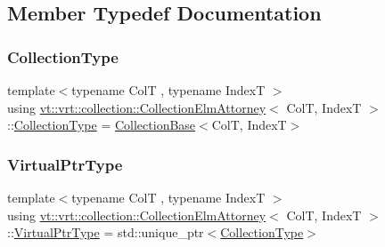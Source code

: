 \subsection{Member Typedef Documentation}
\mbox{\label{structvt_1_1vrt_1_1collection_1_1_collection_elm_attorney_a72d0076f73ac093f85ba5910337c6d02}} 
\subsubsection{\texorpdfstring{Collection\+Type}{CollectionType}}
{\footnotesize\ttfamily template$<$typename ColT , typename IndexT $>$ \\
using \hyperlink{structvt_1_1vrt_1_1collection_1_1_collection_elm_attorney}{vt\+::vrt\+::collection\+::\+Collection\+Elm\+Attorney}$<$ ColT, IndexT $>$\+::\hyperlink{structvt_1_1vrt_1_1collection_1_1_collection_elm_attorney_a72d0076f73ac093f85ba5910337c6d02}{Collection\+Type} =  \hyperlink{structvt_1_1vrt_1_1collection_1_1_collection_base}{Collection\+Base}$<$ColT, IndexT$>$}

\mbox{\label{structvt_1_1vrt_1_1collection_1_1_collection_elm_attorney_a36fe2c7f590baec1038c592db59a6315}} 
\subsubsection{\texorpdfstring{Virtual\+Ptr\+Type}{VirtualPtrType}}
{\footnotesize\ttfamily template$<$typename ColT , typename IndexT $>$ \\
using \hyperlink{structvt_1_1vrt_1_1collection_1_1_collection_elm_attorney}{vt\+::vrt\+::collection\+::\+Collection\+Elm\+Attorney}$<$ ColT, IndexT $>$\+::\hyperlink{structvt_1_1vrt_1_1collection_1_1_collection_elm_attorney_a36fe2c7f590baec1038c592db59a6315}{Virtual\+Ptr\+Type} =  std\+::unique\+\_\+ptr$<$\hyperlink{structvt_1_1vrt_1_1collection_1_1_collection_elm_attorney_a72d0076f73ac093f85ba5910337c6d02}{Collection\+Type}$>$}



